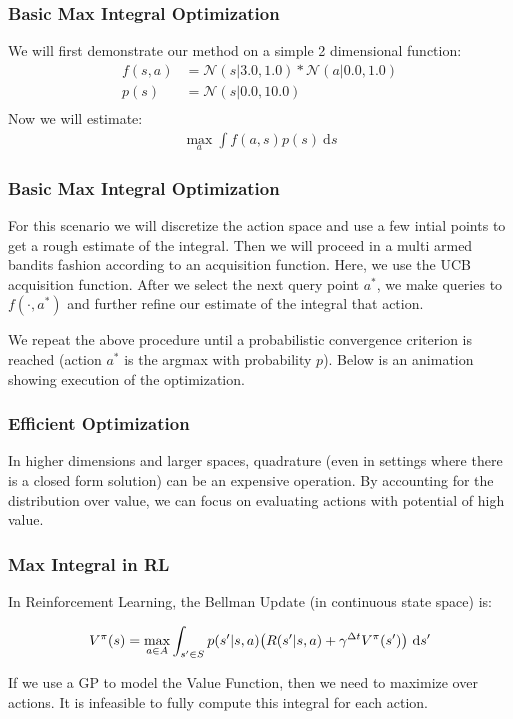 \documentclass[9pt]{beamer}
\begin{document}
\begin{frame}
\frametitle{Basic Max Integral Optimization}
We will first demonstrate our method on a simple 2 dimensional function:
\begin{equation*}
\begin{split}
   f(s,a) &= \mathcal{N}(s | 3.0, 1.0) * \mathcal{N}(a | 0.0, 1.0) \\
   p(s) &= \mathcal{N}(s | 0.0, 10.0) \\
\end{split}
\end{equation*}
Now we will estimate:
\begin{equation*}
\begin{split}
   \max_{a} \int f(a,s) p(s) \ \text{d}s
\end{split}
\end{equation*}
\end{frame}

\begin{frame}
\frametitle{Basic Max Integral Optimization}
For this scenario we will discretize the action space and use a few intial points to get a rough estimate of the integral. Then we will proceed in a multi armed bandits fashion according to an acquisition function. Here, we use the UCB acquisition function. After we select the next query point $a^*$, we make queries to $f(\cdot , a^*)$ and further refine our estimate of the integral that action.

We repeat the above procedure until a probabilistic convergence criterion is reached (action $a^*$ is the argmax with probability $p$). Below is an animation showing execution of the optimization.
\end{frame}

\begin{frame}
\frametitle{Efficient Optimization}
In higher dimensions and larger spaces, quadrature (even in settings where there is a closed form solution) can be an expensive operation. By accounting for the distribution over value, we can focus on evaluating actions with potential of high value.
\end{frame}

\begin{frame}
\frametitle{Max Integral in RL}
In Reinforcement Learning, the Bellman Update (in continuous state space) is:

\[V^{\pi}(s) = \max_{a \in A} \int_{s' \in S} p(s'|s,a)\big(R(s'|s,a) + \gamma^{\Delta t}V^{\pi}(s')\big) \ \textup{d}s' \]

If we use a GP to model the Value Function, then we need to maximize over actions. It is infeasible to fully compute this integral for each action.
\end{frame}
\end{document}
